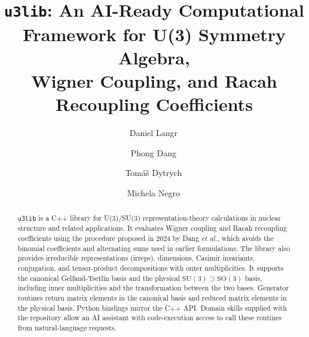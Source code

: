 \documentclass[aps,onecolumn,10pt,superscriptaddress,floatfix,nofootinbib]{revtex4}
\begin{document}
\title{\texttt{u3lib}: An AI-Ready Computational Framework for U(3) Symmetry Algebra,\\ Wigner Coupling, and Racah Recoupling Coefficients}

\author{Daniel Langr\,}

\author{Phong Dang\,}

\author{Tom\'{a}\v{s} Dytrych\,}

\author{Michela Negro\,}

\begin{abstract}
\texttt{u3lib} is a C++ library for U(3)/SU(3) representation-theory
calculations in nuclear structure and related applications. It evaluates
Wigner coupling and Racah recoupling coefficients using the procedure proposed in 2024
by Dang \textit{et al.}, which avoids the binomial coefficients and alternating
sums used in earlier formulations. The library also provides irreducible
representations (irreps), dimensions, Casimir invariants, conjugation, and
tensor-product decompositions with outer multiplicities. It supports the
canonical Gelfand-Tsetlin basis and the physical
$\mathrm{SU(3)}\supset\mathrm{SO(3)}$ basis, including inner multiplicities
and the transformation between the two bases. Generator routines return
matrix elements in the canonical basis and reduced matrix elements in the
physical basis. Python bindings mirror the C++ API. Domain skills supplied
with the repository allow an AI assistant with code-execution access to call
these routines from natural-language requests.

\end{abstract}

\end{document}
